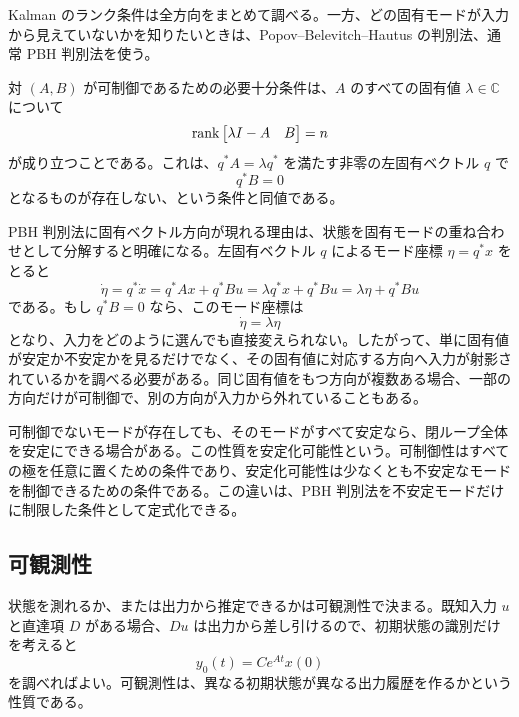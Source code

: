 Kalman のランク条件は全方向をまとめて調べる。一方、どの固有モードが入力から見えていないかを知りたいときは、Popov--Belevitch--Hautus の判別法、通常 PBH 判別法を使う。

\begin{theorem}
対 $(A,B)$ が可制御であるための必要十分条件は、$A$ のすべての固有値 $\lambda\in\mathbb{C}$ について
\begin{equation}
  \operatorname{rank}\begin{bmatrix}\lambda I-A&B\end{bmatrix}=n
  \label{eq:pbh-controllability}
\end{equation}
が成り立つことである。これは、$q^\ast A=\lambda q^\ast$ を満たす非零の左固有ベクトル $q$ で
\begin{equation}
  q^\ast B=0
\end{equation}
となるものが存在しない、という条件と同値である。
\end{theorem}

PBH 判別法に固有ベクトル方向が現れる理由は、状態を固有モードの重ね合わせとして分解すると明確になる。左固有ベクトル $q$ によるモード座標 $\eta=q^\ast x$ をとると
\begin{equation}
  \dot{\eta}=q^\ast\dot{x}=q^\ast Ax+q^\ast Bu
  =\lambda q^\ast x+q^\ast Bu
  =\lambda\eta+q^\ast Bu
\end{equation}
である。もし $q^\ast B=0$ なら、このモード座標は
\begin{equation}
  \dot{\eta}=\lambda\eta
\end{equation}
となり、入力をどのように選んでも直接変えられない。したがって、単に固有値が安定か不安定かを見るだけでなく、その固有値に対応する方向へ入力が射影されているかを調べる必要がある。同じ固有値をもつ方向が複数ある場合、一部の方向だけが可制御で、別の方向が入力から外れていることもある。

可制御でないモードが存在しても、そのモードがすべて安定なら、閉ループ全体を安定にできる場合がある。この性質を安定化可能性という。可制御性はすべての極を任意に置くための条件であり、安定化可能性は少なくとも不安定なモードを制御できるための条件である。この違いは、PBH 判別法を不安定モードだけに制限した条件として定式化できる。

\subsection{可観測性}

状態を測れるか、または出力から推定できるかは可観測性で決まる。既知入力 $u$ と直達項 $D$ がある場合、$Du$ は出力から差し引けるので、初期状態の識別だけを考えると
\begin{equation}
  y_0(t)=Ce^{At}x(0)
\end{equation}
を調べればよい。可観測性は、異なる初期状態が異なる出力履歴を作るかという性質である。

